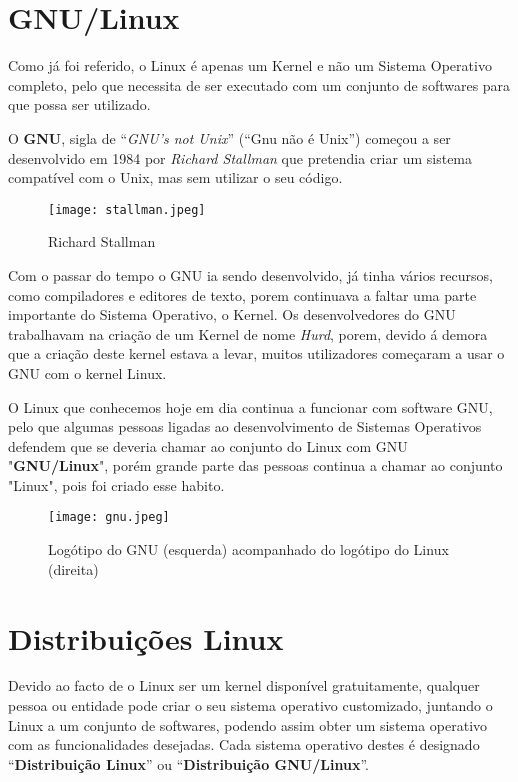 \documentclass{report}
\begin{document}
\section{GNU/Linux}
Como já foi referido, o Linux é apenas um Kernel e não um Sistema Operativo completo, pelo que necessita de ser executado com um conjunto de softwares para que possa ser utilizado. 

\vspace{5mm}

O \textbf{GNU}, sigla de “\textit{GNU’s not Unix}” (“Gnu não é Unix”) começou a ser desenvolvido em 1984 por \textit{Richard Stallman} que pretendia criar um sistema compatível com o Unix, mas sem utilizar o seu código.

\begin{figure}[h!]
    \centering
    \texttt{[image: stallman.jpeg]}
    \caption{Richard Stallman}
\end{figure}

Com o passar do tempo o GNU ia sendo desenvolvido, já tinha vários recursos, como compiladores e editores de texto, porem continuava a faltar uma parte importante do Sistema Operativo, o Kernel. Os desenvolvedores do GNU trabalhavam na criação de um Kernel de nome \textit{Hurd}, porem, devido á demora que a criação deste kernel estava a levar, muitos utilizadores começaram a usar o GNU com o kernel Linux.

\vspace{5mm}

O Linux que conhecemos hoje em dia continua a funcionar com software GNU, pelo que algumas pessoas ligadas ao desenvolvimento de Sistemas Operativos defendem que se deveria chamar ao conjunto do Linux com GNU "\textbf{GNU/Linux}", porém grande parte das pessoas continua a chamar ao conjunto "Linux", pois foi criado esse habito.


\begin{figure}[h!]
    \centering
    \texttt{[image: gnu.jpeg]}
    \caption{Logótipo do GNU (esquerda) acompanhado do logótipo do Linux (direita)}
    \label{fig:my_label}
\end{figure}


\section{Distribuições Linux}

Devido ao facto de o Linux ser um kernel disponível gratuitamente, qualquer pessoa ou entidade pode criar o seu sistema operativo customizado, juntando o Linux a um conjunto de softwares, podendo assim obter um sistema operativo com as funcionalidades desejadas. Cada sistema operativo destes é designado “\textbf{Distribuição Linux}” ou “\textbf{Distribuição GNU/Linux}”.
\end{document}

